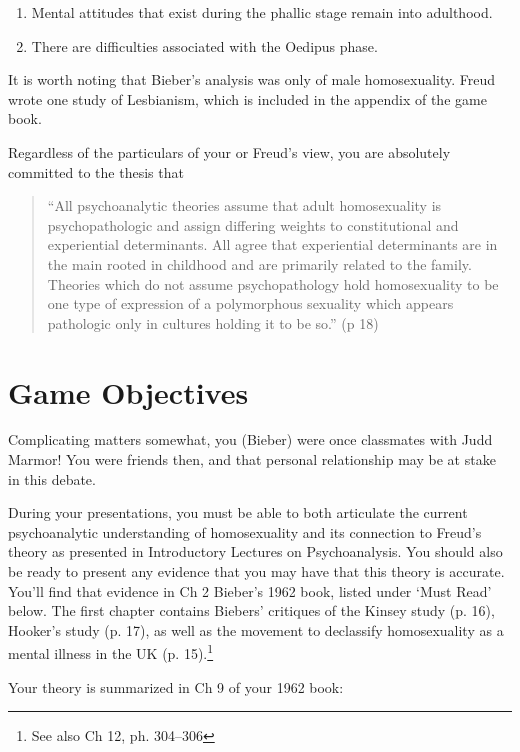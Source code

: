 \begin{refsection}
\begin{enumerate}
\item Mental attitudes that exist during the phallic stage remain into adulthood.

\item There are difficulties associated with the Oedipus phase.

\end{enumerate}

It is worth noting that Bieber's analysis was only of male homosexuality. Freud wrote one study of Lesbianism, which is included in the appendix of the game book.

Regardless of the particulars of your or Freud's view, you are absolutely committed to the thesis that

\begin{quote}

“All psychoanalytic theories assume that adult homosexuality is psychopathologic and assign differing weights to constitutional and experiential determinants. All agree that experiential determinants are in the main rooted in childhood and are primarily related to the family. Theories which do not assume psychopathology hold homosexuality to be one type of expression of a polymorphous sexuality which appears pathologic only in cultures holding it to be so.” (p 18)
\end{quote}

\section{Game Objectives}
\label{gameobjectives}

Complicating matters somewhat, you (Bieber) were once classmates with Judd Marmor! You were friends then, and that personal relationship may be at stake in this debate.

During your presentations, you must be able to both articulate the current psychoanalytic understanding of homosexuality and its connection to Freud's theory as presented in Introductory Lectures on Psychoanalysis. You should also be ready to present any evidence that you may have that this theory is accurate. You'll find that evidence in Ch 2 Bieber's 1962 book, listed under `Must Read' below. The first chapter contains Biebers' critiques of the Kinsey study (p. 16), Hooker's study (p. 17), as well as the movement to declassify homosexuality as a mental illness in the UK (p. 15).\footnote{See also Ch 12, ph. 304--306}

Your theory is summarized in Ch 9 of your 1962 book:


\end{refsection}
